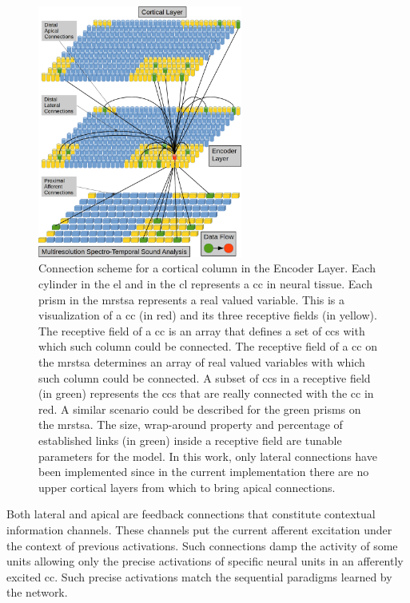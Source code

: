 {\begin{figure}[h!]
    \centering
    \includegraphics[width=0.6\textwidth]{EncoderColumnConnections.png}
    \caption{Connection scheme for a cortical column in the Encoder Layer.
	    Each cylinder in the \gls{el} and in the \gls{cl} represents a \gls{cc} in neural tissue.
	    Each prism in the \gls{mrstsa} represents a real valued variable.
	    This is a visualization of a \gls{cc} (in red) and its three receptive fields (in yellow).
	    The receptive field of a \gls{cc} is an array that defines a set of \glspl{cc}
	    with which such column could be connected.
	    The receptive field of a \gls{cc} on the \gls{mrstsa} determines an array of real valued variables
	    with which such column could be connected.
    A subset of \glspl{cc} in a receptive field (in green) represents the \glspl{cc} that are really
    connected with the \gls{cc} in red. A similar scenario could be described for the green prisms on
    the \gls{mrstsa}.
    The size, wrap-around property and percentage of established links (in green) inside a receptive field are tunable parameters for the model.
    In this work, only lateral connections have been implemented since in the current implementation there are no upper cortical layers from which
    to bring apical connections.}
    \label{fig:EncoderColumnConnections}
\end{figure}

Both lateral and apical are feedback connections that constitute contextual information channels. 
These channels put the current afferent excitation under the context of previous activations.
Such connections damp the activity of some units allowing only the precise activations
of specific neural units in an afferently excited \gls{cc}.
Such precise activations match the sequential paradigms learned by the network.

}
